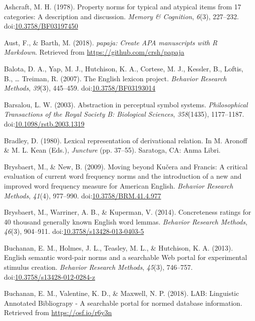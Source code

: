 \documentclass[english,,man]{apa6}
\theoremstyle{definition}
\theoremstyle{definition}
\theoremstyle{definition}
\theoremstyle{remark}
\begin{document}
\hypertarget{refs}{}
\hypertarget{ref-Ashcraft1978a}{}
Ashcraft, M. H. (1978). Property norms for typical and atypical items
from 17 categories: A description and discussion. \emph{Memory \&
Cognition}, \emph{6}(3), 227--232.
doi:\href{https://doi.org/10.3758/BF03197450}{10.3758/BF03197450}

\hypertarget{ref-R-papaja}{}
Aust, F., \& Barth, M. (2018). \emph{papaja: Create APA manuscripts with
R Markdown}. Retrieved from \url{https://github.com/crsh/papaja}

\hypertarget{ref-Balota2007}{}
Balota, D. A., Yap, M. J., Hutchison, K. A., Cortese, M. J., Kessler,
B., Loftis, B., \ldots{} Treiman, R. (2007). The English lexicon
project. \emph{Behavior Research Methods}, \emph{39}(3), 445--459.
doi:\href{https://doi.org/10.3758/BF03193014}{10.3758/BF03193014}

\hypertarget{ref-Barsalou2003}{}
Barsalou, L. W. (2003). Abstraction in perceptual symbol systems.
\emph{Philosophical Transactions of the Royal Society B: Biological
Sciences}, \emph{358}(1435), 1177--1187.
doi:\href{https://doi.org/10.1098/rstb.2003.1319}{10.1098/rstb.2003.1319}

\hypertarget{ref-Bradley1980}{}
Bradley, D. (1980). Lexical representation of derivational relation. In
M. Aronoff \& M. L. Kean (Eds.), \emph{Juncture} (pp. 37--55). Saratoga,
CA: Anma Libri.

\hypertarget{ref-Brysbaert2009}{}
Brysbaert, M., \& New, B. (2009). Moving beyond Kučera and Francis: A
critical evaluation of current word frequency norms and the introduction
of a new and improved word frequency measure for American English.
\emph{Behavior Research Methods}, \emph{41}(4), 977--990.
doi:\href{https://doi.org/10.3758/BRM.41.4.977}{10.3758/BRM.41.4.977}

\hypertarget{ref-Brysbaert2013}{}
Brysbaert, M., Warriner, A. B., \& Kuperman, V. (2014). Concreteness
ratings for 40 thousand generally known English word lemmas.
\emph{Behavior Research Methods}, \emph{46}(3), 904--911.
doi:\href{https://doi.org/10.3758/s13428-013-0403-5}{10.3758/s13428-013-0403-5}

\hypertarget{ref-Buchanan2013}{}
Buchanan, E. M., Holmes, J. L., Teasley, M. L., \& Hutchison, K. A.
(2013). English semantic word-pair norms and a searchable Web portal for
experimental stimulus creation. \emph{Behavior Research Methods},
\emph{45}(3), 746--757.
doi:\href{https://doi.org/10.3758/s13428-012-0284-z}{10.3758/s13428-012-0284-z}

\hypertarget{ref-Buchanan2018}{}
Buchanan, E. M., Valentine, K. D., \& Maxwell, N. P. (2018). LAB:
Linguistic Annotated Bibliograpy - A searchable portal for normed
database information. Retrieved from \url{https://osf.io/r6y3n}
\end{document}
